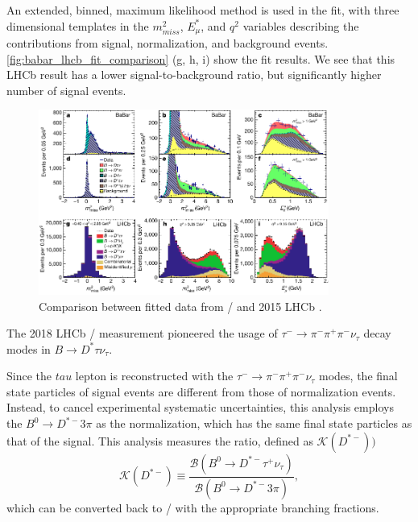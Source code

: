An extended, binned, maximum likelihood method is used in the fit, with three
dimensional templates in the $m^2_{miss}$, $E^*_\mu$, and $q^2$ variables
describing the contributions from signal, normalization, and background events.
\autoref{fig:babar_lhcb_fit_comparison} (g, h, i) show the fit results.
We see that this LHCb result has a lower signal-to-background ratio, but
significantly higher number of signal events.

\begin{figure}[ht]
    \centering
    \includegraphics[width=0.85\textwidth]{figs/babar_lhcb_fit_comparison.pdf}
    \caption{
        Comparison between fitted data from \BaBar/ and 2015
        LHCb \cite{Ciezarek:2017yzh}.
    }
    \label{fig:babar_lhcb_fit_comparison}
\end{figure}

The 2018 LHCb \RDst/ measurement pioneered the usage of
$\tau^- \rightarrow \pi^- \pi^+ \pi^- \nu_\tau$
decay modes in $B \rightarrow D^{*} \tau \nu_\tau$.

Since the $tau$ lepton is reconstructed with the
$\tau^- \rightarrow \pi^- \pi^+ \pi^- \nu_\tau$ modes, the final state particles
of signal events are different from those of normalization events.
Instead, to cancel experimental systematic uncertainties, this analysis employs
the $B^0 \rightarrow D^{*-} 3\pi$ as the normalization, which has the same final
state particles as that of the signal.
This analysis measures the ratio, defined as $\mathcal{K}(D^{*-}))$
\begin{equation}
    \mathcal{K}(D^{*-}) \equiv \frac{
        \mathcal{B}(B^0 \rightarrow D^{*-} \tau^+ \nu_\tau)
    }{
        \mathcal{B}(B^0 \rightarrow D^{*-} 3 \pi)
    },
\end{equation}
which can be converted back to \RDst/ with the appropriate branching fractions.

